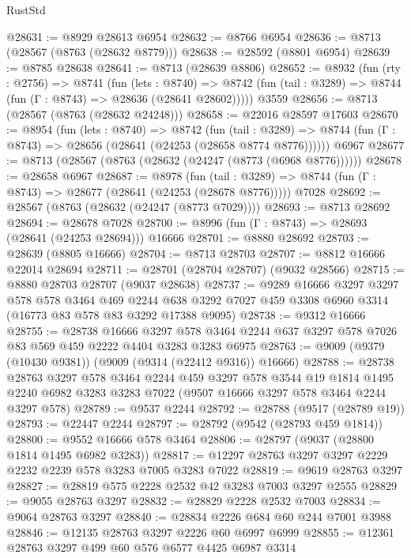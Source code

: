 \begin{lexlean}{RustStd}
\begin{coremodule}
@28631 := @8929 @28613 @6954
@28632 := @8766 @6954
@28636 := @8713 (@28567 (@8763 (@28632 @8779)))
@28638 := @28592 (@8801 @6954)
@28639 := @8785 @28638
@28641 := @8713 (@28639 @8806)
@28652 := @8932
    (fun (rty : @2756) =>
    @8741
      (fun (lets : @8740) =>
      @8742 (fun (tail : @3289) => @8744 (fun (Γ : @8743) => @28636 (@28641 @28602)))))
    @3559
@28656 := @8713 (@28567 (@8763 (@28632 @24248)))
@28658 := @22016 @28597 @17603
@28670 := @8954
    (fun (lets : @8740) =>
    @8742
      (fun (tail : @3289) =>
      @8744 (fun (Γ : @8743) => @28656 (@28641 (@24253 (@28658 @8774 @8776))))))
    @6967
@28677 := @8713 (@28567 (@8763 (@28632 (@24247 (@8773 (@6968 @8776))))))
@28678 := @28658 @6967
@28687 := @8978
    (fun (tail : @3289) => @8744 (fun (Γ : @8743) => @28677 (@28641 (@24253 (@28678 @8776)))))
    @7028
@28692 := @28567 (@8763 (@28632 (@24247 (@8773 @7029))))
@28693 := @8713 @28692
@28694 := @28678 @7028
@28700 := @8996 (fun (Γ : @8743) => @28693 (@28641 (@24253 @28694))) @16666
@28701 := @8880 @28692
@28703 := @28639 (@8805 @16666)
@28704 := @8713 @28703
@28707 := @8812 @16666 @22014 @28694
@28711 := @28701 (@28704 @28707) (@9032 @28566)
@28715 := @8880 @28703 @28707 (@9037 @28638)
@28737 := @9289
    @16666
    @3297
    @3297
    @578
    @578
    @3464
    @469
    @2244
    @638
    @3292
    @7027
    @459
    @3308
    @6960
    @3314
    (@16773 @83 @578 @83 @3292 @17388 @9095)
@28738 := @9312 @16666
@28755 := @28738
    @16666
    @3297
    @578
    @3464
    @2244
    @637
    @3297
    @578
    @7026
    @83
    @569
    @459
    @2222
    @4404
    @3283
    @3283
    @6975
@28763 := @9009 (@9379 (@10430 @9381)) (@9009 (@9314 (@22412 @9316)) @16666)
@28788 := @28738
    @28763
    @3297
    @578
    @3464
    @2244
    @459
    @3297
    @578
    @3544
    @19
    @1814
    @1495
    @2240
    @6982
    @3283
    @3283
    @7022
    (@9507 @16666 @3297 @578 @3464 @2244 @3297 @578)
@28789 := @9537 @2244
@28792 := @28788 (@9517 (@28789 @19))
@28793 := @22447 @2244
@28797 := @28792 (@9542 (@28793 @459 @1814))
@28800 := @9552 @16666 @578 @3464
@28806 := @28797 (@9037 (@28800 @1814 @1495 @6982 @3283))
@28817 := @12297 @28763 @3297 @3297 @2229 @2232 @2239 @578 @3283 @7005 @3283 @7022
@28819 := @9619 @28763 @3297
@28827 := @28819 @575 @2228 @2532 @42 @3283 @7003 @3297 @2555
@28829 := @9055 @28763 @3297
@28832 := @28829 @2228 @2532 @7003
@28834 := @9064 @28763 @3297
@28840 := @28834 @2226 @684 @60 @244 @7001 @3988
@28846 := @12135 @28763 @3297 @2226 @60 @6997 @6999
@28855 := @12361 @28763 @3297 @499 @60 @576 @6577 @4425 @6987 @3314

\end{coremodule}
\end{lexlean}
